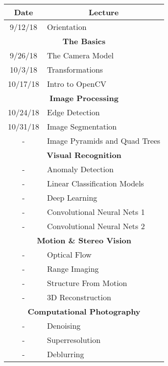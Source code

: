 \documentclass{article}
\begin{document}
\begin{table}[H]
\centering
\begin{tabular}{|c|l|}
\hline
\textbf{Date} & \multicolumn{1}{c|}{\textbf{Lecture}} \\ \hline
9/12/18    & Orientation                           \\ \hline
\multicolumn{2}{|c|}{\textbf{The Basics}}          \\ \hline
9/26/18    & The Camera Model                      \\ \hline
10/3/18    & Transformations                       \\ \hline
10/17/18   & Intro to OpenCV                       \\ \hline
\multicolumn{2}{|c|}{\textbf{Image Processing}}    \\ \hline
10/24/18   & Edge Detection                        \\ \hline
10/31/18   &  Image Segmentation                   \\ \hline
-    & Image Pyramids and Quad Trees               \\ \hline
\multicolumn{2}{|c|}{\textbf{Visual Recognition}}  \\ \hline
-    & Anomaly Detection                           \\ \hline
-    & Linear Classification Models                \\ \hline
-    & Deep Learning                               \\ \hline
-    & Convolutional Neural Nets 1                 \\ \hline
-    & Convolutional Neural Nets 2                 \\ \hline
\multicolumn{2}{|c|}{\textbf{Motion \& Stereo Vision}}  \\ \hline
-    & Optical Flow                                \\ \hline
-    & Range Imaging                               \\ \hline
-    & Structure From Motion                       \\ \hline
-    & 3D Reconstruction                           \\ \hline
\multicolumn{2}{|c|}{\textbf{Computational Photography}} \\ \hline
-    & Denoising                                   \\ \hline
-    & Superresolution                             \\ \hline
-    & Deblurring                                  \\ \hline

\end{tabular}
\end{table}
\end{document}
